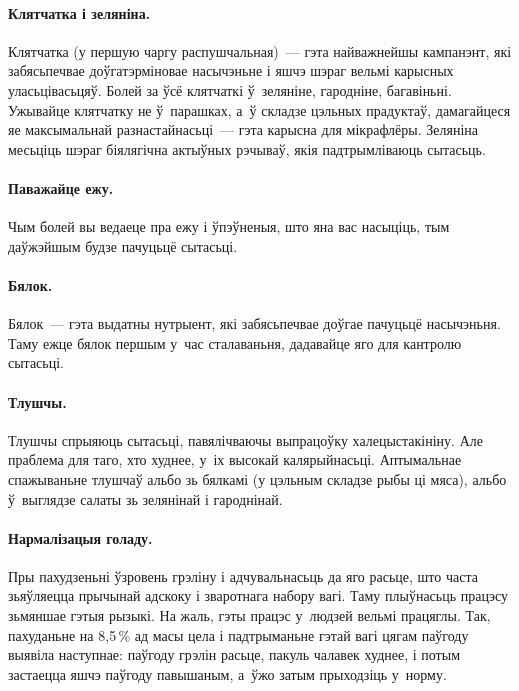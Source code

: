 \paragraph{Клятчатка і зеляніна.}
Клятчатка (у першую чаргу распушчальная)~--- гэта найважнейшы кампанэнт, які забясьпечвае доўгатэрміновае насычэньне і яшчэ шэраг вельмі карысных уласьцівасьцяў. Болей за ўсё клятчаткі ў~зеляніне, гародніне, багавіньні. Ужывайце клятчатку не ў~парашках, а~ў складзе цэльных прадуктаў, дамагайцеся яе максымальнай разнастайнасьці~--- гэта карысна для мікрафлёры. Зеляніна месьціць шэраг біялягічна актыўных рэчываў, якія падтрымліваюць сытасьць.


\paragraph{Паважайце ежу.}
Чым болей вы ведаеце пра ежу і ўпэўненыя, што яна вас насыціць, тым даўжэйшым будзе пачуцьцё сытасьці.

\paragraph{Бялок.}
Бялок~--- гэта выдатны нутрыент, які забясьпечвае доўгае пачуцьцё насычэньня. Таму ежце бялок першым у~час сталаваньня, дадавайце яго для кантролю сытасьці.

\paragraph{Тлушчы.}
Тлушчы спрыяюць сытасьці, павялічваючы выпрацоўку халецыстакініну. Але праблема для таго, хто худнее, у~іх высокай калярыйнасьці. Аптымальнае спажываньне тлушчаў альбо зь бялкамі (у цэльным складзе рыбы ці мяса), альбо ў~выглядзе салаты зь зелянінай і гароднінай.

\paragraph{Нармалізацыя голаду.}
Пры пахудзеньні ўзровень грэліну і адчувальнасьць да яго расьце, што часта зьяўляецца прычынай адскоку і зваротнага набору вагі. Таму плыўнасьць працэсу зьмяншае гэтыя рызыкі. На жаль, гэты працэс у~людзей вельмі працяглы. Так, пахуданьне на 8,5\,\% ад масы цела і падтрыманьне гэтай вагі  цягам паўгоду выявіла наступнае: паўгоду грэлін расьце, пакуль чалавек худнее, і потым застаецца яшчэ паўгоду павышаным, а~ўжо затым прыходзіць у~норму.

